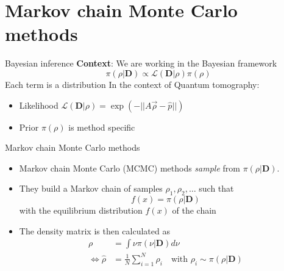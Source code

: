 \documentclass{beamer}
\newcommand{\mb}{\mathbf}
\newcommand{\tb}{\textbf}
\begin{document}
\section{Markov chain Monte Carlo methods}
\begin{frame}{Bayesian inference}
    \tb{Context}: We are working in the Bayesian framework
    \begin{equation}
        \pi (\rho|\mb D) \propto \mathcal{L}(\mb D|\rho) \pi(\rho)
    \end{equation}
    Each term is a distribution\medbreak
    In the context of Quantum tomography:
    \begin{itemize}
        \item Likelihood $\mathcal{L}(\mb D|\rho) = \exp(-||A \vec\rho - \hat p||)$
        \item Prior $\pi(\rho)$ is method specific
    \end{itemize}
\end{frame}
\begin{frame}{Markov chain Monte Carlo methods}
    \begin{itemize}
        \item Markov chain Monte Carlo (MCMC) methods \textit{sample} from $\pi (\rho|\mb D)$.
        \item They build a Markov chain of samples $\rho_1, \rho_2, \dots$ such that
        \begin{equation}
            f(x) =\pi (\rho|\mb D)
        \end{equation}
        with the equilibrium distribution $f(x)$ of the chain
        \item The density matrix is then calculated as
        \begin{align}
            \rho &= \int \nu \pi(\nu|\mb D) d\nu\\
            \Leftrightarrow \hat \rho &= \frac{1}{N}\sum_{i=1}^N \rho_i \quad \text{with } \rho_i \sim \pi(\rho|\mb D)
        \end{align}
            
    \end{itemize}
\end{frame}
\end{document}
